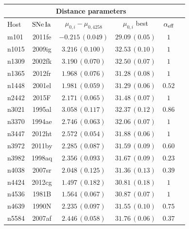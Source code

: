 \begin{table}[tbp]
\centering
\begin{tabular}{@{}lccccr}
\hline
\multicolumn{5}{c}{Distance parameters} \\
\hline
Host & $\mathrm{SNe\,Ia}$ & $\mu_{0,i}-\mu_{0,4258}$ & $\mu_{0,i} $ best & $\alpha_{\mathrm{eff}}$ \\
\hline

 m101 & 2011fe & $-0.215\,(0.049)$&$29.09\,(0.05)$ &$1$ \\
 
 n1015 & 2009ig & $3.216\,(0.100)$&$32.53\,(0.10)$ &$1$ \\

 n1309 & 2002fk & $3.190\,(0.070)$& $32.50\,(0.07)$& $ 1$ \\
  
 n1365 & 2012fr & $1.968\,(0.076)$& $31.28\,(0.08)$& $ 1$ \\
   
 n1448 & 2001el & $1.981\,(0.059)$& $31.29\,(0.06)$& $ 0.52$ \\   
   
 n2442 & 2015F & $2.171\,(0.065)$& $31.48\,(0.07)$& $ 1$ \\
    
 n3021 & 1995al & $3.058\,(0.117)$& $32.37\,(0.12)$& $ 0.86$ \\
     
 n3370 & 1994ae & $2.746\,(0.063)$& $32.06\,(0.07)$& $1 $  \\
      
 n3447 & 2012ht & $2.572\,(0.054)$& $31.88\,(0.06)$& $1 $  \\
 
 n3972 & 2011by & $2.285\,(0.087)$& $31.59\,(0.09)$& $0.60 $  \\ 
 
 n3982 & 1998aq & $2.356\,(0.093)$& $31.67\,(0.09)$& $ 0.23$ \\
  
 n4038 & 2007sr & $2.048\,(0.125)$& $31.36\,(0.13)$& $ 0.39$ \\  
  
 n4424 & 2012cg & $1.497\,(0.182)$& $30.81\,(0.18)$& $ 1$ \\  
  
 n4536 & 1981B & $1.564\,(0.067)$&$30.87\,(0.07)$ &$1$ \\

 n4639 & 1990N & $2.235\,(0.097)$& $31.55\,(0.10)$& $0.75 $ \\
    
 n5584 & 2007af & $2.446\,(0.058)$& $31.76\,(0.06)$& $ 0.37$ \\
       

\end{tabular}
\end{table}

